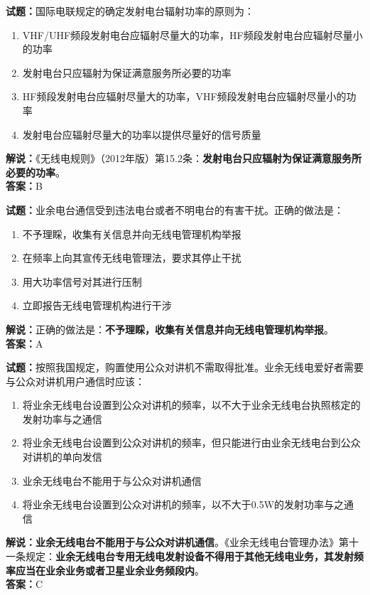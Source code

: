 \documentclass{ctexbook}
\begin{document}
\bigskip


\noindent\textbf{试题：}国际电联规定的确定发射电台辐射功率的原则为：
\begin{enumerate}[leftmargin=3em]
\item VHF/UHF频段发射电台应辐射尽量大的功率，HF频段发射电台应辐射尽量小的功率
\item 发射电台只应辐射为保证满意服务所必要的功率
\item HF频段发射电台应辐射尽量大的功率，VHF频段发射电台应辐射尽量小的功率
\item 发射电台应辐射尽量大的功率以提供尽量好的信号质量
\end{enumerate}
\noindent\textbf{解说：}《无线电规则》（2012年版）第15.2条：\textbf{发射电台只应辐射为保证满意服务所必要的功率}。\\\noindent\textbf{答案：}B


\bigskip


\noindent\textbf{试题：}业余电台通信受到违法电台或者不明电台的有害干扰。正确的做法是：
\begin{enumerate}[leftmargin=3em]
\item 不予理睬，收集有关信息并向无线电管理机构举报
\item 在频率上向其宣传无线电管理法，要求其停止干扰
\item 用大功率信号对其进行压制
\item 立即报告无线电管理机构进行干涉
\end{enumerate}
\noindent\textbf{解说：}正确的做法是：\textbf{不予理睬，收集有关信息并向无线电管理机构举报}。\\\noindent\textbf{答案：}A



\bigskip


\noindent\textbf{试题：}按照我国规定，购置使用公众对讲机不需取得批准。业余无线电爱好者需要与公众对讲机用户通信时应该：
\begin{enumerate}[leftmargin=3em]
\item 将业余无线电台设置到公众对讲机的频率，以不大于业余无线电台执照核定的发射功率与之通信
\item 将业余无线电台设置到公众对讲机的频率，但只能进行由业余无线电台到公众对讲机的单向发信
\item 业余无线电台不能用于与公众对讲机通信
\item 将业余无线电台设置到公众对讲机的频率，以不大于0.5W的发射功率与之通信
\end{enumerate}
\noindent\textbf{解说：}\textbf{业余无线电台不能用于与公众对讲机通信}。《业余无线电台管理办法》第十一条规定：\textbf{业余无线电台专用无线电发射设备不得用于其他无线电业务，其发射频率应当在业余业务或者卫星业余业务频段内}。\\\noindent\textbf{答案：}C
\end{document}
